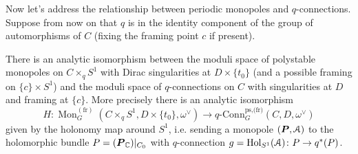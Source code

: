 \documentclass[10pt, oneside]{article}
\DeclareMathOperator{\mon}{Mon}
\newcommand{\qconn}{q\text{-Conn}}
\newcommand{\fr}{\mathrm{fr}}
\DeclareMathOperator{\Hol}{Hol}
\begin{document}
Now let's address the relationship between periodic monopoles and $q$-connections.  Suppose from now on that $q$ is in the identity component of the group of automorphisms of $C$ (fixing the framing point $c$ if present).

\begin{theorem} \label{monopole_qconn_comparison_thm}
There is an analytic isomorphism between the moduli space of polystable monopoles on $C \times_q S^1$ with Dirac singularities at $D \times \{t_0\}$ (and a possible framing on $\{c\} \times S^1$) and the moduli space of $q$-connections on $C$ with singularities at $D$ and framing at $\{c\}$.  More precisely there is an analytic isomorphism
\[H \colon \mon^{(\fr)}_G(C \times_q S^1, D \times \{t_0\}, \omega^\vee) \to \qconn_G^{\text{ps,(fr)}}(C, D, \omega^\vee)\]
given by the holonomy map around $S^1$, i.e. sending a monopole $(\boldsymbol{P}, \mathcal{A})$ to the holomorphic bundle $P = (\boldsymbol{P}_{\mathbb{C}})|_{C_0}$ with $q$-connection $g = \Hol_{S^1}(\mc A) \colon P \to q^*(P)$.
 
\end{theorem}
\end{document}
